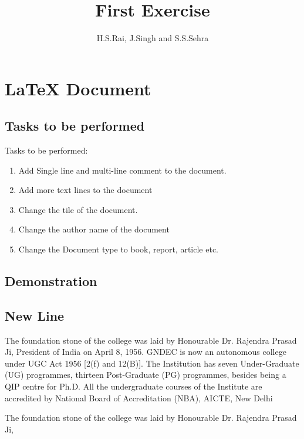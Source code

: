 \documentclass[12pt, letterpaper, twoside]{book}
\title{First Exercise}
\author{H.S.Rai, J.Singh and S.S.Sehra}
\begin{document}
\maketitle

\chapter{LaTeX Document}
\section*{Tasks to be performed}
Tasks to be performed:
\begin{enumerate}
	\item Add Single line and multi-line comment to the document.
    \item Add more text lines to the document
    \item Change the tile of the document.
   \item Change the author name of the document
   \item Change the Document type to book, report, article etc.
\end{enumerate}
\section*{Demonstration}

\section{New Line}
The foundation stone of the college was laid by Honourable Dr. Rajendra Prasad Ji, President of India on April 8, 1956. GNDEC is now an autonomous college under UGC Act 1956 [2(f) and 12(B)]. The Institution has seven Under-Graduate (UG) programmes, thirteen Post-Graduate (PG) programmes, besides being a QIP centre for Ph.D. All the undergraduate courses of the Institute are accredited by  National Board of Accreditation (NBA), AICTE, New Delhi

The foundation stone of the college was laid by Honourable Dr. Rajendra Prasad Ji,
\end{document}
